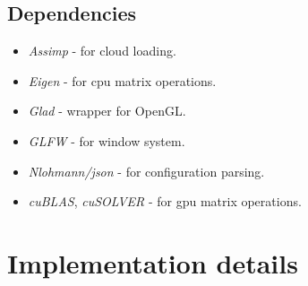 \documentclass[titlepage]{article}
\begin{document}
\subsection{Dependencies}
\begin{itemize}
\item \textit{Assimp} - for cloud loading.
\item \textit{Eigen} - for cpu matrix operations.
\item \textit{Glad} - wrapper for OpenGL.
\item \textit{GLFW} - for window system.
\item \textit{Nlohmann/json} - for configuration parsing.
\item \textit{cuBLAS}, \textit{cuSOLVER} - for gpu matrix operations.
\end{itemize}

\section{Implementation details}
\label{sec:ImplementationDetails}
\end{document}
